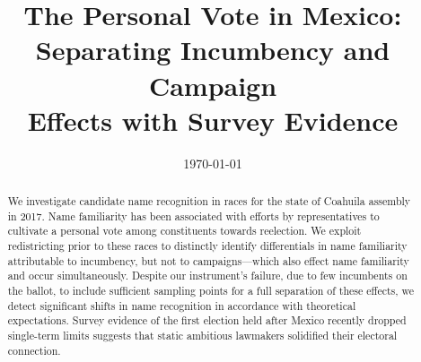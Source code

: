 \documentclass[letter,12pt]{article}
\begin{document}
\title{The Personal Vote in Mexico: \\ Separating Incumbency and Campaign \\Effects with Survey Evidence}%
\date{\today}
\maketitle


\begin{abstract}
\noindent We investigate candidate name recognition in races for the state of Coahuila assembly in 2017. Name familiarity has been associated with efforts by representatives to cultivate a personal vote among constituents towards reelection. We exploit redistricting prior to these races to distinctly identify differentials in name familiarity attributable to incumbency, but not to campaigns---which also effect name familiarity and occur simultaneously. Despite our instrument's failure, due to few incumbents on the ballot, to include sufficient sampling points for a full separation of these effects, we detect significant shifts in name recognition in accordance with theoretical expectations. Survey evidence of the first election held after Mexico recently dropped single-term limits suggests that static ambitious lawmakers solidified their electoral connection.
\end{abstract}
\end{document}
